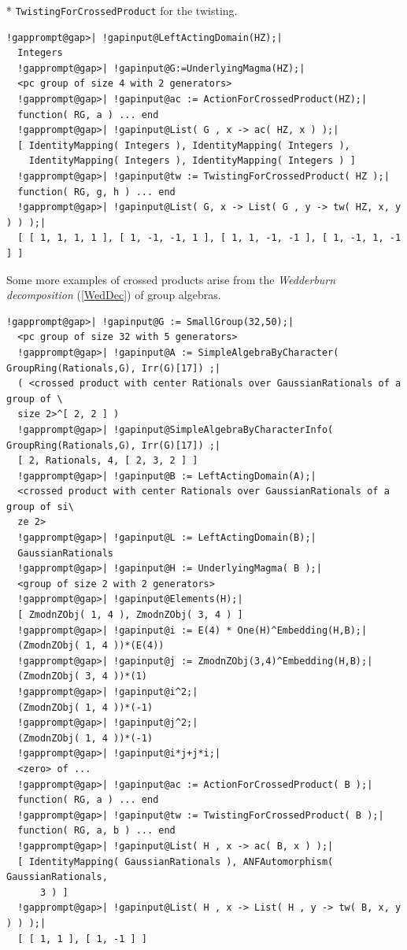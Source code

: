 \documentclass[a4paper,11pt]{report}
\begin{document}
{{{ *  \texttt{TwistingForCrossedProduct} for the twisting. 
\begin{Verbatim}[commandchars=!@|,fontsize=\small,frame=single,label=Example]
  !gapprompt@gap>| !gapinput@LeftActingDomain(HZ);|
  Integers
  !gapprompt@gap>| !gapinput@G:=UnderlyingMagma(HZ);|
  <pc group of size 4 with 2 generators>
  !gapprompt@gap>| !gapinput@ac := ActionForCrossedProduct(HZ);|
  function( RG, a ) ... end
  !gapprompt@gap>| !gapinput@List( G , x -> ac( HZ, x ) );|
  [ IdentityMapping( Integers ), IdentityMapping( Integers ),
    IdentityMapping( Integers ), IdentityMapping( Integers ) ]
  !gapprompt@gap>| !gapinput@tw := TwistingForCrossedProduct( HZ );|
  function( RG, g, h ) ... end
  !gapprompt@gap>| !gapinput@List( G, x -> List( G , y -> tw( HZ, x, y ) ) );|
  [ [ 1, 1, 1, 1 ], [ 1, -1, -1, 1 ], [ 1, 1, -1, -1 ], [ 1, -1, 1, -1 ] ]  
\end{Verbatim}
 Some more examples of crossed products arise from the \emph{Wedderburn decomposition} (\ref{WedDec}) of group algebras. 
\begin{Verbatim}[commandchars=!@|,fontsize=\small,frame=single,label=Example]
  !gapprompt@gap>| !gapinput@G := SmallGroup(32,50);|
  <pc group of size 32 with 5 generators>
  !gapprompt@gap>| !gapinput@A := SimpleAlgebraByCharacter( GroupRing(Rationals,G), Irr(G)[17]) ;|
  ( <crossed product with center Rationals over GaussianRationals of a group of \
  size 2>^[ 2, 2 ] )
  !gapprompt@gap>| !gapinput@SimpleAlgebraByCharacterInfo( GroupRing(Rationals,G), Irr(G)[17]) ;|
  [ 2, Rationals, 4, [ 2, 3, 2 ] ]
  !gapprompt@gap>| !gapinput@B := LeftActingDomain(A);|
  <crossed product with center Rationals over GaussianRationals of a group of si\
  ze 2>
  !gapprompt@gap>| !gapinput@L := LeftActingDomain(B);|
  GaussianRationals
  !gapprompt@gap>| !gapinput@H := UnderlyingMagma( B );|
  <group of size 2 with 2 generators>
  !gapprompt@gap>| !gapinput@Elements(H);|
  [ ZmodnZObj( 1, 4 ), ZmodnZObj( 3, 4 ) ]
  !gapprompt@gap>| !gapinput@i := E(4) * One(H)^Embedding(H,B);|
  (ZmodnZObj( 1, 4 ))*(E(4))
  !gapprompt@gap>| !gapinput@j := ZmodnZObj(3,4)^Embedding(H,B);|
  (ZmodnZObj( 3, 4 ))*(1)
  !gapprompt@gap>| !gapinput@i^2;|
  (ZmodnZObj( 1, 4 ))*(-1)
  !gapprompt@gap>| !gapinput@j^2;|
  (ZmodnZObj( 1, 4 ))*(-1)
  !gapprompt@gap>| !gapinput@i*j+j*i;|
  <zero> of ...
  !gapprompt@gap>| !gapinput@ac := ActionForCrossedProduct( B );|
  function( RG, a ) ... end
  !gapprompt@gap>| !gapinput@tw := TwistingForCrossedProduct( B );|
  function( RG, a, b ) ... end
  !gapprompt@gap>| !gapinput@List( H , x -> ac( B, x ) );|
  [ IdentityMapping( GaussianRationals ), ANFAutomorphism( GaussianRationals,
      3 ) ]
  !gapprompt@gap>| !gapinput@List( H , x -> List( H , y -> tw( B, x, y ) ) );|
  [ [ 1, 1 ], [ 1, -1 ] ]
\end{Verbatim}
 
}}}
\end{document}
